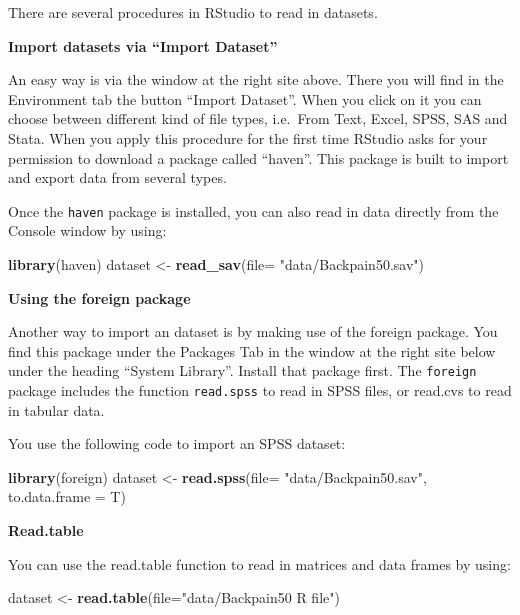 \documentclass[
]{book}
\newenvironment{Shaded}{\begin{snugshade}}{\end{snugshade}}
\newcommand{\DataTypeTok}[1]{\textcolor[rgb]{0.13,0.29,0.53}{#1}}
\newcommand{\KeywordTok}[1]{\textcolor[rgb]{0.13,0.29,0.53}{\textbf{#1}}}
\newcommand{\NormalTok}[1]{#1}
\newcommand{\StringTok}[1]{\textcolor[rgb]{0.31,0.60,0.02}{#1}}
\begin{document}
There are several procedures in RStudio to read in datasets.

\textbf{Import datasets via ``Import Dataset''}

An easy way is via the window at the right site above. There you will
find in the Environment tab the button ``Import Dataset''. When you
click on it you can choose between different kind of file types,
i.e.~From Text, Excel, SPSS, SAS and Stata. When you apply this
procedure for the first time RStudio asks for your permission to
download a package called ``haven''. This package is built to import and
export data from several types.

Once the \texttt{haven} package is installed, you can also read in data
directly from the Console window by using:

\begin{Shaded}
\begin{Highlighting}[]
\KeywordTok{library}\NormalTok{(haven)}
\NormalTok{dataset <-}\StringTok{ }\KeywordTok{read_sav}\NormalTok{(}\DataTypeTok{file=} \StringTok{"data/Backpain50.sav"}\NormalTok{)}
\end{Highlighting}
\end{Shaded}

\textbf{Using the foreign package}

Another way to import an dataset is by making use of the foreign
package. You find this package under the Packages Tab in the window at
the right site below under the heading ``System Library''. Install that
package first. The \texttt{foreign} package includes the function
\texttt{read.spss} to read in SPSS files, or read.cvs to read in tabular
data.

You use the following code to import an SPSS dataset:

\begin{Shaded}
\begin{Highlighting}[]
\KeywordTok{library}\NormalTok{(foreign)}
\NormalTok{dataset <-}\StringTok{ }\KeywordTok{read.spss}\NormalTok{(}\DataTypeTok{file=} \StringTok{"data/Backpain50.sav"}\NormalTok{, }\DataTypeTok{to.data.frame =}\NormalTok{ T)}
\end{Highlighting}
\end{Shaded}

\textbf{Read.table}

You can use the read.table function to read in matrices and data frames
by using:

\begin{Shaded}
\begin{Highlighting}[]
\NormalTok{dataset <-}\StringTok{ }\KeywordTok{read.table}\NormalTok{(}\DataTypeTok{file=}\StringTok{"data/Backpain50 R file"}\NormalTok{)}
\end{Highlighting}
\end{Shaded}
\end{document}
